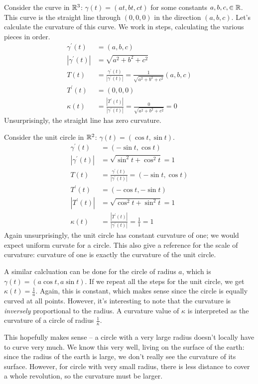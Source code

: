 \documentclass[fleqn,letterpaper]{report}
\begin{document}
\begin{example}
Consider the curve in $\mathbb{R}^3$: $\gamma(t) = (at, bt, ct)$
for some constants $a,b,c,\in \mathbb{R}$. This curve is the straight
line through $(0,0,0)$ in the direction $(a,b,c)$. Let's
calculate the curvature of this curve. We work in steps,
calculating the various pieces in order.
\begin{align*}
\gamma^\prime(t) & = (a,b,c) \\
|\gamma^\prime(t)| & = \sqrt{a^2 + b^2 + c^2} \\
T(t) & = \frac{\gamma^\prime(t)}{|\gamma^\prime(t)|} = 
\frac{1}{\sqrt{a^2 + b^2 + c^2}} (a,b,c) \\
T^\prime(t) & = (0,0,0) \\
\kappa(t) & = \frac{|T^\prime(t)|}{|\gamma^\prime(t)|} =
\frac{0}{\sqrt{a^2 +b^2 + c^2}} = 0
\end{align*}
Unsurprisingly, the straight line has zero curvature. 
\end{example}

\begin{example}
Consider the unit circle in $\mathbb{R}^2$: $\gamma(t) = (\cos t,
\sin t)$. 
\begin{align*}
\gamma^\prime(t) & = (-\sin t, \cos t) \\
|\gamma^\prime(t)| & = \sqrt{\sin^2 t + \cos^2 t} = 1 \\
T(t) & = \frac{\gamma^\prime(t)}{|\gamma^\prime(t)|} = 
(-\sin t, \cos t) \\
T^\prime(t) & = (-\cos t, - \sin t) \\
|T^\prime(t)| & = \sqrt{ \cos^2 t + \sin^2 t} = 1 \\
\kappa(t) & = \frac{|T^\prime(t)|}{|\gamma^\prime(t)|} =
\frac{1}{1} = 1
\end{align*}
Again unsurprisingly, the unit circle has constant curvature of
one; we would expect uniform curvate for a circle. This also
give a reference for the scale of curvature: curvature of one
is exactly the curvature of the unit circle. 
\end{example}

\begin{example}
A similar calcluation can be done for the circle of radius $a$,
which is $\gamma(t) = (a \cos t, a \sin t)$. If we repeat all
the steps for the unit circle, we get $\kappa(t) = \frac{1}{a}$.
Again, this is constant, which makes sense since the circle is
equally curved at all points. However, it's interesting to note
that the curvature is \emph{inversely} proportional to the
radius.  A curvature value of $\kappa$ is interpreted as the
curvature of a circle of radius $\frac{1}{\kappa}$. 

This hopefully makes sense -- a circle with a very large radius
doesn't locally have to curve very much. We know this very
well, living on the surface of the earth: since the radius of
the earth is large, we don't really see the curvature of its
surface. However, for circle with very small radius, there is
less distance to cover a whole revolution, so the curvature
must be larger. 
\end{example}
\end{document}
